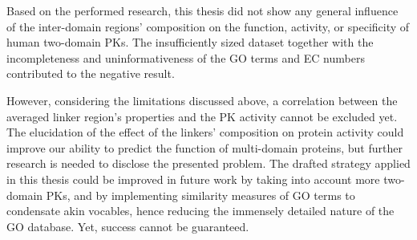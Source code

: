 \label{conclusion}

Based on the performed research, this thesis did not show any general influence of the
inter-domain regions' composition on the function, activity, or specificity of human
two-domain PKs.
The insufficiently sized dataset together with the incompleteness and uninformativeness
of the GO terms and EC numbers contributed to the negative result.

However, considering the limitations discussed above, a correlation between the averaged
linker region's properties and the PK activity cannot be excluded yet.
The elucidation of the effect of the linkers' composition on protein activity could
improve our ability to predict the function of multi-domain proteins, but further
research is needed to disclose the presented problem.
The drafted strategy applied in this thesis could be improved in future work by taking
into account more two-domain PKs, and by implementing similarity measures of GO terms to
condensate akin vocables, hence reducing the immensely detailed nature of the GO database.
Yet, success cannot be guaranteed.
